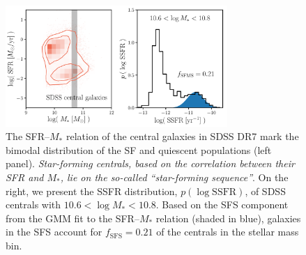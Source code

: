 \documentclass[12pt, letterpaper, preprint, tighten]{aastex62}
\begin{document}

\begin{figure}
\begin{center}
\includegraphics[width=0.75\textwidth]{figs/groupcat.pdf}
    \caption{The SFR--$M_*$ relation of the central galaxies in SDSS DR7
    mark the bimodal distribution of the SF and quiescent populations (left panel). 
    \emph{Star-forming centrals, based on the correlation between their
    SFR and $M_*$, lie on the so-called ``star-forming sequence''}.
    On the right, we present the SSFR distribution, $p(\log\mathrm{SSFR})$,
    of SDSS centrals with $10.6 < \log M_* < 10.8$. Based on the SFS component
    from the \cite{hahn2018a} GMM fit to the SFR--$M_*$ relation (shaded in blue),
    galaxies in the SFS account for $f_\mathrm{SFS} = 0.21$ of the centrals
    in the stellar mass bin.} \label{fig:groupcat}
\end{center}
\end{figure}
\end{document}

